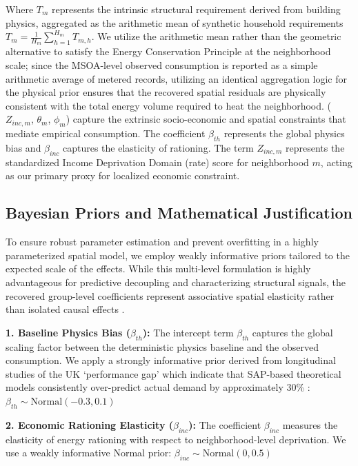 \documentclass[11pt, a4paper, twocolumn]{article}
\begin{document}
Where \(T_{m}\) represents the intrinsic structural requirement 
derived from building physics, aggregated as the arithmetic mean of synthetic household requirements \(T_{m} = \frac{1}{H_m} \sum_{h=1}^{H_m} T_{m,h}\). We utilize the arithmetic mean rather than the geometric alternative to satisfy the Energy Conservation Principle at the neighborhood scale; since the MSOA-level observed consumption is reported as a simple arithmetic average of metered records, utilizing an identical aggregation logic for the physical prior ensures that the recovered spatial residuals are physically consistent with the total energy volume required to heat the neighborhood.
(\(Z_{inc, m}\), \(\theta_m\), \(\phi_m\)) capture the 
extrinsic socio-economic and spatial constraints that mediate 
empirical consumption. The coefficient \(\beta_{th}\) represents the global physics bias and
\(\beta_{inc}\) captures the elasticity of rationing. The term
\(Z_{inc, m}\) represents the standardized Income Deprivation
Domain (rate) score for neighborhood \(m\), acting as our primary proxy
for localized economic constraint.

\subsection{Bayesian Priors and Mathematical
Justification}\label{bayesian-priors-and-mathematical-justification}

To ensure robust parameter estimation and prevent overfitting in a
highly parameterized spatial model, we employ weakly informative priors
tailored to the expected scale of the effects. While this multi-level 
formulation is highly advantageous for predictive decoupling and characterizing 
structural signals, the recovered group-level coefficients represent 
associative spatial elasticity rather than isolated causal effects 
\cite{Gelman2006}.

\textbf{1. Baseline Physics Bias (\(\beta_{th}\)):} The intercept term
\(\beta_{th}\) captures the global scaling factor between the
deterministic physics baseline and the observed consumption. We apply a
strongly informative prior derived from longitudinal studies of the UK
`performance gap' which indicate that SAP-based theoretical models
consistently over-predict actual demand by approximately 30\% \cite{Tinsley2022, DECC2013}: 
$\beta_{th} \sim \text{Normal}(-0.3, 0.1)$

\textbf{2. Economic Rationing Elasticity (\(\beta_{inc}\)):}
 The
coefficient \(\beta_{inc}\) measures the elasticity of energy rationing
with respect to neighborhood-level deprivation. We use a weakly
informative Normal prior: $\beta_{inc} \sim \text{Normal}(0, 0.5)$
\end{document}
